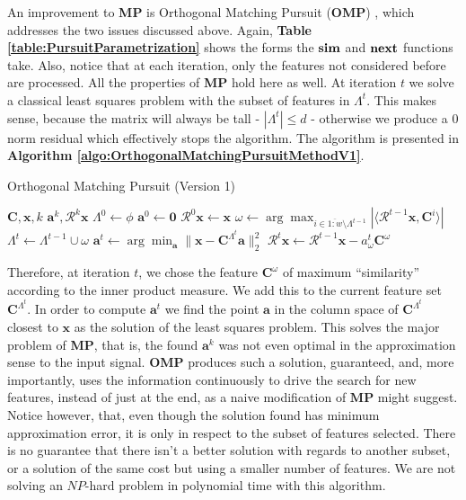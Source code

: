 \documentclass[12pt,a4paper,oneside,english]{UPBThesis}
\newcommand{\hcrange}[2]{\overline{{#1}\colon\!\!{#2}}}
\begin{document}
An improvement to \textbf{MP} is Orthogonal Matching Pursuit (\textbf{OMP}) \cite{matchingpursuit2,orthopursuit}, which addresses the two issues discussed above. Again, \textbf{Table \ref{table:PursuitParametrization}} shows the forms the $\text{\textbf{sim}}$ and $\text{\textbf{next}}$ functions take. Also, notice that at each iteration, only the features not considered before are processed. All the properties of \textbf{MP} hold here as well. At iteration $t$ we solve a classical least squares problem with the subset of features in $\Lambda^t$. This makes sense, because the matrix will always be tall - $\left| \Lambda^t \right| \leq d$ - otherwise we produce a $0$ norm residual which effectively stops the algorithm. The algorithm is presented in \textbf{Algorithm \ref{algo:OrthogonalMatchingPursuitMethodV1}}.

\begin{algorithm}
\caption{Orthogonal Matching Pursuit (Version 1)}
\label{algo:OrthogonalMatchingPursuitMethodV1}
\begin{algorithmic}
\Require $\textbf{C},\textbf{x},k$
\Ensure $\textbf{a}^k,\mathcal{R}^k\textbf{x}$
\State $\Lambda^0 \gets \phi$
\State $\textbf{a}^0 \gets \textbf{0}$
\State $\mathcal{R}^0\textbf{x} \gets \textbf{x}$
\For {$t = \hcrange{1}{k}$}
\State $\omega \gets \arg \max_{i \in \hcrange{1}{w} \setminus \Lambda^{t-1}} \left| \langle \mathcal{R}^{t-1}\textbf{x} , \textbf{C}^i \rangle \right|$
\State $\Lambda^t \gets \Lambda^{t-1} \cup \omega$
\State $\textbf{a}^t \gets \arg\min_{\textbf{a}} {\| \textbf{x} - \textbf{C}^{\Lambda^t}\textbf{a} \|_2^2}$
\State $\mathcal{R}^t\textbf{x} \gets \mathcal{R}^{t-1}\textbf{x} - a_\omega^t\textbf{C}^\omega$
\EndFor
\end{algorithmic}
\end{algorithm}

Therefore, at iteration $t$, we chose the feature $\textbf{C}^\omega$ of maximum ``similarity'' according to the inner product measure. We add this to the current feature set $\textbf{C}^{\Lambda^t}$. In order to compute $\textbf{a}^t$ we find the point $\textbf{a}$ in the column space of $\textbf{C}^{\Lambda^t}$ closest to $\textbf{x}$ as the solution of the least squares problem. This solves the major problem of \textbf{MP}, that is, the found $\textbf{a}^k$ was not even optimal in the approximation sense to the input signal. \textbf{OMP} produces such a solution, guaranteed, and, more importantly, uses the information continuously to drive the search for new features, instead of just at the end, as a naive modification of $\textbf{MP}$ might suggest. Notice however, that, even though the solution found has minimum approximation error, it is only in respect to the subset of features selected. There is no guarantee that there isn't a better solution with regards to another subset, or a solution of the same cost but using a smaller number of features. We are not solving an $NP$-hard problem in polynomial time with this algorithm.
\end{document}
